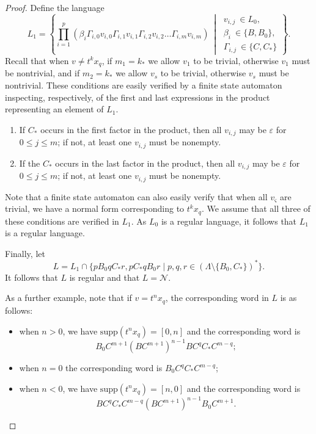 \documentclass[11pt]{amsart}
\newcommand{\cC}{\varsigma}
\theoremstyle{definition}
\newcommand\support{\mathrm{supp}}
\begin{document}
\begin{proof}
Define the language
\begin{dmath*}
L_1=
 \left\{\prod_{i=1}^p\left(\beta_i\Gamma_{i,0}v_{i,0}\Gamma_{i,1}v_{i,1}\Gamma_{i,2}v_{i,2}\dots \Gamma_{i,m}v_{i,m}\right)\ \middle|\ \begin{array}{ll}
 v_{i,j}~\in L_0,\\
\beta_i~\in\{B,B_0\}, \\ \Gamma_{i,j}~\in \{C,C_\ast \}\end{array}\right\}.
\end{dmath*}
Recall that when $v \neq t^kx_q$,
if $m_1 = k_*$ we allow $v_1$ to be trivial, otherwise $v_1$ must be nontrivial,
and if $m_2 = k_*$ we allow $v_s$ to be trivial, otherwise $v_s$ must be nontrivial.
These conditions are easily verified by a finite state automaton  inspecting, respectively, of the first and last expressions in the product representing an element of $L_1$.
\begin{enumerate}
    \item If $C_*$ occurs in the first factor in the product, then all $v_{i,j}$ may be $\varepsilon$ for $0 \leq j \leq m$; if not, at least one $v_{i,j}$ must be nonempty.
    \item If the $C_*$ occurs in the last factor in the product, then all $v_{i,j}$ may be $\varepsilon$ for $0 \leq j \leq m$; if not, at least one $v_{i,j}$ must be nonempty.
\end{enumerate}
Note that a  finite state automaton can also easily  verify that when all $v_\cC$ are trivial, we have a normal form corresponding to $t^kx_q$.  We assume that all three of these conditions are verified in $L_1$.
As  $L_0$ is a regular language, it follows that $L_1$ is a regular language.

Finally, let
\[ L=L_1\cap \{pB_0qC_\ast r, pC_\ast qB_0r\mid p,q,r\in (\Lambda\setminus\{B_0,C_*\})^*\} . \]
It follows that $L$ is regular and that $L = {\mathcal N}$.


As a further example,
note that if $v = t^nx_q$,
the corresponding word in $L$ is  as follows:
\begin{itemize}[itemsep=5pt]
\item when $n> 0$, we have $\support(t^nx_q) = [0,n]$
and the corresponding  word is \[B_0C^{m+1}(BC^{m+1})^{n-1}B C^qC_*C^{m-q};\]

\item when $n=0$ the corresponding word is $B_0 C^qC_*C^{m-q}$;

\smallskip

\item when $n < 0$, we have $\support(t^nx_q) = [n,0]$ and the corresponding  word is \[B
C^qC_*C^{m-q}
(BC^{m+1})^{n-1}B_0C^{m+1}.\]
\end{itemize}






\end{proof}
\end{document}
